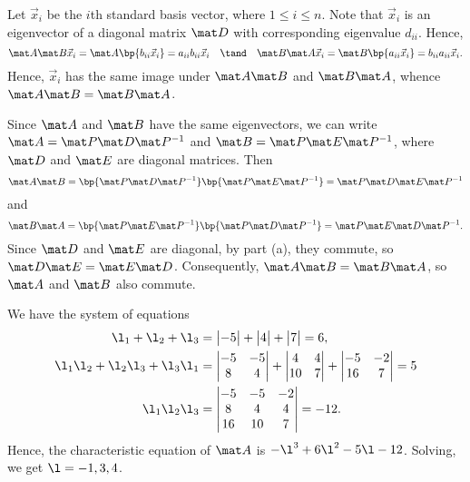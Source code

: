 \begin{solution}
    \begin{ppart}
        Let $\vec x_i$ be the $i$th standard basis vector, where $1 \leq i \leq n$. Note that $\vec x_i$ is an eigenvector of a diagonal matrix $\mat D$ with corresponding eigenvalue $d_{ii}$. Hence, \[\mat A \mat B \vec x_i = \mat A \bp{b_{ii} \vec x_i} = a_{ii} b_{ii} \vec x_i \quad \tand \quad \mat B \mat A \vec x_i = \mat B \bp{a_{ii} \vec x_i} = b_{ii} a_{ii} \vec x_i.\] Hence, $\vec x_i$ has the same image under $\mat A \mat B$ and $\mat B \mat A$, whence $\mat A \mat B = \mat B \mat A$.
    \end{ppart}
    \begin{ppart}
        Since $\mat A$ and $\mat B$ have the same eigenvectors, we can write $\mat A = \mat P \mat D \mat P^{-1}$ and $\mat B = \mat P \mat E \mat P^{-1}$, where $\mat D$ and $\mat E$ are diagonal matrices. Then \[\mat A \mat B = \bp{\mat P \mat D \mat P^{-1}}\bp{\mat P \mat E \mat P^{-1}} = \mat P \mat D \mat E \mat P^{-1}\] and \[\mat B \mat A = \bp{\mat P \mat E \mat P^{-1}}\bp{\mat P \mat D \mat P^{-1}} = \mat P \mat E \mat D \mat P^{-1}.\] Since $\mat D$ and $\mat E$ are diagonal, by part (a), they commute, so $\mat D \mat E = \mat E \mat D$. Consequently, $\mat A \mat B = \mat B \mat A$, so $\mat A$ and $\mat B$ also commute.
    \end{ppart}
    \begin{ppart}
        We have the system of equations
        \begin{align*}
            \l_1 + \l_2 + \l_3 &= \begin{vmatrix}-5\end{vmatrix} + \begin{vmatrix}4\end{vmatrix} + \begin{vmatrix}7\end{vmatrix} = 6,\\
            \l_1 \l_2 + \l_2 \l_3 + \l_3 \l_1 &= \begin{vmatrix}-5 & -5 \\ 8 & 4\end{vmatrix} + \begin{vmatrix}4 & 4 \\ 10 & 7\end{vmatrix} + \begin{vmatrix}-5 & -2 \\ 16 & 7\end{vmatrix} = 5 \\
            \l_1 \l_2 \l_3 &= \begin{vmatrix}-5 & -5 & -2 \\ 8 & 4 & 4 \\ 16 & 10 & 7\end{vmatrix} = -12.
        \end{align*}
        Hence, the characteristic equation of $\mat A$ is $-\l^3 + 6\l^2 - 5 \l - 12$. Solving, we get $\l = -1, 3, 4$.


\end{ppart}
\end{solution}
